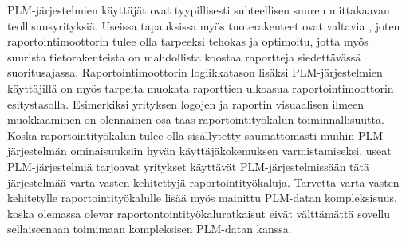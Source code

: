PLM-järjestelmien käyttäjät ovat tyypillisesti suhteellisen suuren mittakaavan teollisuusyrityksiä. Useissa tapauksissa myös tuoterakenteet ovat valtavia \cite{rohleder_requirements_2014}, joten raportointimoottorin tulee olla tarpeeksi tehokas ja optimoitu, jotta myös suurista tietorakenteista on mahdollista koostaa raportteja siedettävässä suoritusajassa. Raportointimoottorin logiikkatason lisäksi PLM-järjestelmien käyttäjillä on myös tarpeita muokata raporttien ulkoasua raportointimoottorin esitystasolla. Esimerkiksi yrityksen logojen ja raportin visuaalisen ilmeen muokkaaminen on olennainen osa taas raportointityökalun toiminnallisuutta. Koska raportointityökalun tulee olla sisällytetty saumattomasti muihin PLM-järjestelmän ominaisuuksiin hyvän käyttäjäkokemuksen varmistamiseksi, useat PLM-järjestelmiä tarjoavat yritykset käyttävät PLM-järjestelmissään tätä järjestelmää varta vasten kehitettyjä raportointityökaluja. Tarvetta varta vasten kehitetylle raportointityökalulle lisää myös mainittu PLM-datan kompleksisuus, koska olemassa olevar raportontointityökaluratkaisut eivät välttämättä sovellu sellaiseenaan toimimaan kompleksisen PLM-datan kanssa.
